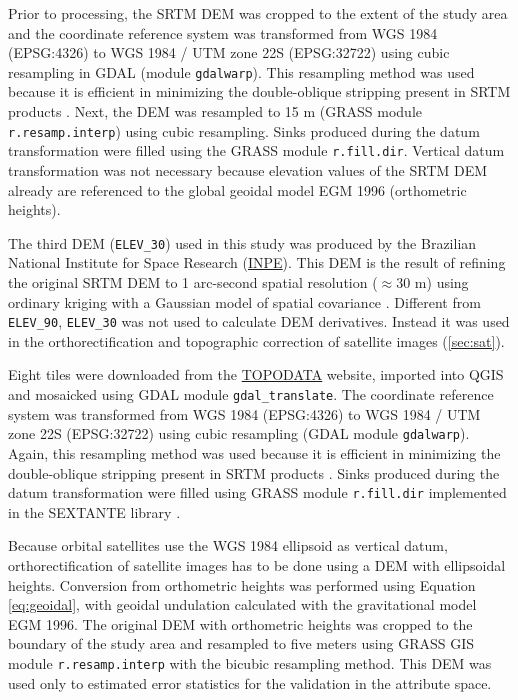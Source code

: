 Prior to processing, the SRTM DEM was cropped to the extent of the study area and the coordinate reference system was transformed from WGS 1984 (EPSG:4326) to WGS 1984 / UTM zone 22S (EPSG:32722) using cubic resampling in GDAL (module \texttt{gdalwarp}). This resampling method was used because it is efficient in minimizing the double-oblique stripping present in SRTM products \citep{Samuel-RosaEtAl2013c}. Next, the DEM was resampled to 15 m (GRASS module \texttt{r.resamp.interp}) using cubic resampling. Sinks produced during the datum transformation were filled using the GRASS module \texttt{r.fill.dir}. Vertical datum transformation was not necessary because elevation values of the SRTM DEM already are referenced to the global geoidal model EGM 1996 (orthometric heights).

The third DEM (\texttt{ELEV\_30}) used in this study was produced by the Brazilian National Institute for Space Research (\href{http://www.inpe.br/}{INPE}). This DEM is the result of refining the original SRTM DEM to 1 arc-second spatial resolution ($\approx$30 m) using ordinary kriging with a Gaussian model of spatial covariance \citep{ValerianoEtAl2012}. Different from \texttt{ELEV\_90}, \texttt{ELEV\_30} was not used to calculate DEM derivatives. Instead it was used in the orthorectification and topographic correction of satellite images (\ref{sec:sat}).

Eight tiles were downloaded from the \href{http://www.dsr.inpe.br/topodata/}{TOPODATA} website, imported into QGIS and mosaicked using GDAL module \texttt{gdal\_translate}. The coordinate reference system was transformed from WGS 1984 (EPSG:4326) to WGS 1984 / UTM zone 22S (EPSG:32722) using cubic resampling (GDAL module \texttt{gdalwarp}). Again, this resampling method was used because it is efficient in minimizing the double-oblique stripping present in SRTM products \citep{Samuel-RosaEtAl2013c}. Sinks produced during the datum transformation were filled using GRASS module \texttt{r.fill.dir} implemented in the SEXTANTE library \citep{SEXTANTE2012}.

Because orbital satellites use the WGS 1984 ellipsoid as vertical datum, orthorectification of satellite images has to be done using a DEM with ellipsoidal heights. Conversion from orthometric heights was performed using Equation \ref{eq:geoidal}, with geoidal undulation calculated with the gravitational model EGM 1996. The original DEM with orthometric heights was cropped to the boundary of the study area and resampled to five meters using GRASS GIS module \texttt{r.resamp.interp} with the bicubic resampling method. This DEM was used only to estimated error statistics for the validation in the attribute space.

